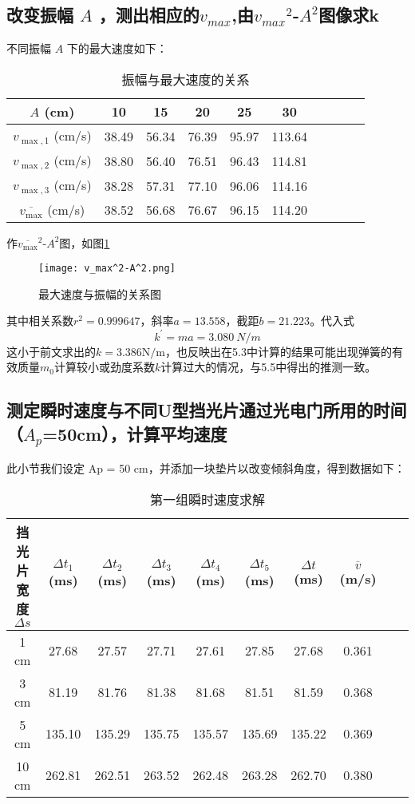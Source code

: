 \documentclass[11pt]{article}
\begin{document}
	\subsection{改变振幅 $A$ ，测出相应的$v_{max}$,由${v_{max}}^2$-$A^2$图像求k}
	不同振幅 $A$ 下的最大速度如下：
	\begin{table}[H]\centering
		\caption{振幅与最大速度的关系}
		\label{振幅与最大速度的关系}
		\begin{tabular}{cccccccccc}\toprule
			$A$ (cm) & 10 & 15 & 20 & 25 & 30 \\
			\midrule
			$v_{\max, 1}$ (cm/s) &38.49	&56.34	&76.39	&95.97	&113.64 \\
			$v_{\max, 2}$ (cm/s) &38.80	&56.40	&76.51	&96.43	&114.81 \\
			$v_{\max, 3}$ (cm/s) &38.28	&57.31	&77.10	&96.06	&114.16 \\
			$\overline{v_{\max}}$ (cm/s) &38.52	&56.68	&76.67	&96.15	&114.20 \\
			\bottomrule
		\end{tabular}
	\end{table}
	作$\overline{v_{\max}}^2$-$A^2$图，如图\ref{fig:v_max^2-A^2}
	\begin{figure}[H]
		\centering
		\texttt{[image: v\_max^2-A^2.png]}
		\caption{最大速度与振幅的关系图}
		\label{fig:v_max^2-A^2}
	\end{figure}
	其中相关系数$r^2=0.999647$，斜率$a=13.558$，截距$b=21.223$。代入式
	\[k^{\prime}=ma=\SI{3.080}{N/m}\]
	这小于前文求出的$k=3.386\mathrm{N/m}$，也反映出在5.3中计算的结果可能出现弹簧的有效质量$m_0$计算较小或劲度系数$k$计算过大的情况，与5.5中得出的推测一致。
	
	\subsection{测定瞬时速度与不同U型挡光片通过光电门所用的时间（$A_p$=50cm），计算平均速度}
	此小节我们设定 Ap = 50 cm，并添加一块垫片以改变倾斜角度，得到数据如下：
	
	\begin{table}[H]\centering
	\caption{第一组瞬时速度求解}
	\begin{tabular}{cccccccccc}
		\toprule
		挡光片宽度$\Delta s$ & $\Delta t_1$ (ms) & $\Delta t_2$ (ms) & $\Delta t_3$ (ms) & $\Delta t_4$ (ms) & $\Delta t_5$ (ms) & $\Delta t$ (ms) & $\overline{v}$ (m/s)  \\
		\midrule
		1 cm   &27.68 &27.57 &27.71 &27.61 &27.85 &27.68  & 0.361\\
		3  cm  &81.19 &81.76 &81.38 &81.68 &81.51 &81.59  & 0.368\\
		5  cm  &135.10 &135.29 &135.75 &135.57 &135.69 &135.22 & 0.369\\
		10  cm &262.81 &262.51 &263.52 &262.48 &263.28 &262.70 & 0.380
		\\
		\bottomrule
	\end{tabular}
	\end{table}
	
\end{document}
